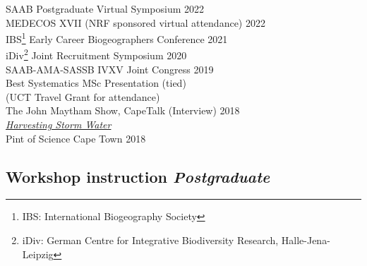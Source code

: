 \documentclass[10pt]{article}
\begin{document}
\begin{multicols}{2}
SAAB Postgraduate Virtual Symposium                      \hfill {\small 2022} \\
MEDECOS XVII {\small (NRF sponsored virtual attendance)} \hfill {\small 2022} \\
IBS\footnote{IBS: International Biogeography Society}
  Early Career Biogeographers Conference                 \hfill {\small 2021} \\
iDiv\footnote{
    iDiv: German Centre for Integrative Biodiversity Research, Halle-Jena-Leipzig}
  Joint Recruitment Symposium                            \hfill {\small 2020} \\
SAAB-AMA-SASSB IVXV Joint Congress                       \hfill {\small 2019} \\
  \hspace{2em} {\small Best Systematics MSc Presentation (tied)}              \\
  \hspace{2em} {\small (UCT Travel Grant for attendance)}                     \\
The John Maytham Show, CapeTalk     {\small (Interview)} \hfill {\small 2018} \\
  \hspace{2em} {\small \href{https://www.capetalk.co.za/articles/328900/harvesting-stormwater-from-liesbeek-river-may-aid-ct-water-supply-students-find}
                            {\textit{Harvesting Storm Water}}}                \\
Pint of Science Cape Town                                \hfill {\small 2018} \\

\columnbreak

\subsection*{Workshop instruction %
                                 \hfill {\small \textmd{\textit{Postgraduate}}}}


\end{multicols}
\end{document}
